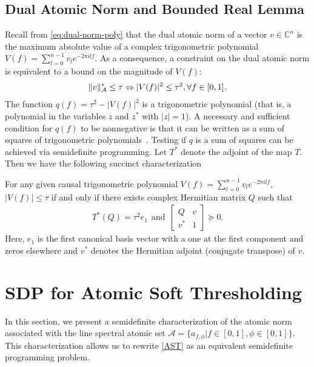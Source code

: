\subsection{Dual Atomic Norm and Bounded Real Lemma}
Recall from \eqref{eq:dual-norm-poly} that the dual atomic norm of a vector $v
\in \mathbb{C}^n$ is the maximum absolute value of a complex trigonometric
polynomial $V(f) = \sum_{l=0}^{n-1} v_l e^{-2\pi i l f}$. As a
consequence, a constraint on the dual atomic norm is equivalent to
a bound on the magnitude of $V(f)$:
\begin{align*}
\|v\|_{\mathcal{A}}^* \leq \tau \Leftrightarrow |V(f)|^2 \leq \tau^2, \forall f \in [0, 1].
\end{align*}
The function $q(f) = \tau^2-|V(f)|^2$ is a trigonometric polynomial (that is, a
polynomial in the variables $z$ and $z^*$ with $|z|=1$). A necessary and
sufficient condition for $q(f)$ to be nonnegative is that it can be written as
a sum of squares of trigonometric polynomials~\cite{Megretski03}. 
Testing if $q$ is a sum of squares can be achieved
via semidefinite programming. Let $T^*$ denote the adjoint of the map $T$. Then we have the following
succinct characterization

\begin{lemma}\cite[Theorem 4.24]{brl2007}\label{lm:brl} For any given causal trigonometric polynomial $V(f) = \sum_{l=0}^{n-1} v_l
e^{-2\pi i l f}$, $|V(f)| \leq \tau $ if and only if there exists complex
Hermitian matrix $Q$ such that
\begin{align*}
T^*(Q) = \tau^2 {e}_1~~\mbox{and}~~
\begin{bmatrix}
  Q & v \\
  v^* & 1
 \end{bmatrix} \succeq 0.
\end{align*}
Here, ${e}_1$ is the first canonical basis vector with a one at the first
component and zeros elsewhere and $v^*$ denotes the Hermitian adjoint
(conjugate transpose) of $v$.
\end{lemma}

\section{SDP for Atomic Soft Thresholding}
\label{sec:sdp-ast}

In this section, we present a semidefinite characterization of the atomic norm
associated with the line spectral atomic set $\mathcal{A} = \{a_{f,\phi} | f
\in [0, 1], \phi \in [0, 1]\}$. This characterization allows us to rewrite
 {\eqref{AST}} as an equivalent semidefinite programming problem.



